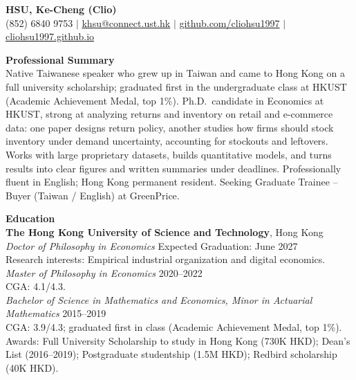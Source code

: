 \documentclass[11pt,letterpaper]{article}
\begin{document}
{\Large \textbf{HSU, Ke-Cheng (Clio)}}\\[1pt]
(852) 6840 9753 \quad $|$ \quad \href{mailto:khsu@connect.ust.hk}{khsu@connect.ust.hk} \quad $|$ \quad \href{https://github.com/cliohsu1997}{github.com/cliohsu1997} \quad $|$ \quad \href{https://cliohsu1997.github.io/}{cliohsu1997.github.io}

\vspace{0.15pt}

{\large \textbf{Professional Summary}}\\[-0.5pt]
Native Taiwanese speaker who grew up in Taiwan and came to Hong Kong on a full university scholarship; graduated first in the undergraduate class at HKUST (Academic Achievement Medal, top 1\%). Ph.D.\ candidate in Economics at HKUST, strong at analyzing returns and inventory on retail and e-commerce data: one paper designs return policy, another studies how firms should stock inventory under demand uncertainty, accounting for stockouts and leftovers. Works with large proprietary datasets, builds quantitative models, and turns results into clear figures and written summaries under deadlines. Professionally fluent in English; Hong Kong permanent resident. Seeking Graduate Trainee -- Buyer (Taiwan / English) at GreenPrice.

\vspace{0.15pt}

{\large \textbf{Education}}\\[-0.5pt]
\textbf{The Hong Kong University of Science and Technology}, Hong Kong\\
\textit{Doctor of Philosophy in Economics} \hfill Expected Graduation: June 2027\\
Research interests: Empirical industrial organization and digital economics.\\
\textit{Master of Philosophy in Economics} \hfill 2020--2022\\
CGA: 4.1/4.3.\\
\textit{Bachelor of Science in Mathematics and Economics, Minor in Actuarial Mathematics} \hfill 2015--2019\\
CGA: 3.9/4.3; graduated first in class (Academic Achievement Medal, top 1\%).\\
Awards: Full University Scholarship to study in Hong Kong (730K HKD); Dean's List (2016--2019); Postgraduate studentship (1.5M HKD); Redbird scholarship (40K HKD).

\vspace{0.15pt}
\end{document}
